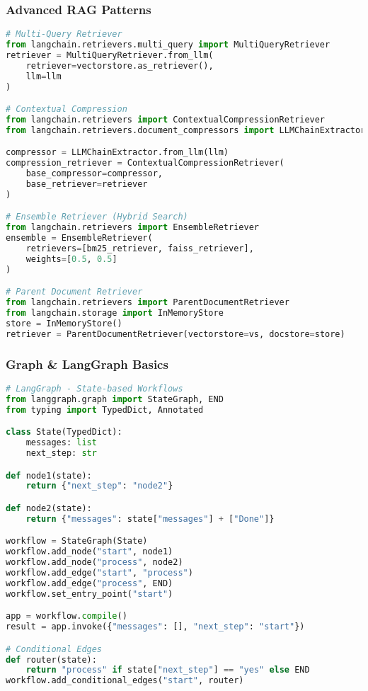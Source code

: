 \begin{frame}[fragile]\frametitle{Advanced RAG Patterns}
\begin{lstlisting}[language=python,basicstyle=\tiny]
# Multi-Query Retriever
from langchain.retrievers.multi_query import MultiQueryRetriever
retriever = MultiQueryRetriever.from_llm(
    retriever=vectorstore.as_retriever(),
    llm=llm
)

# Contextual Compression
from langchain.retrievers import ContextualCompressionRetriever
from langchain.retrievers.document_compressors import LLMChainExtractor

compressor = LLMChainExtractor.from_llm(llm)
compression_retriever = ContextualCompressionRetriever(
    base_compressor=compressor,
    base_retriever=retriever
)

# Ensemble Retriever (Hybrid Search)
from langchain.retrievers import EnsembleRetriever
ensemble = EnsembleRetriever(
    retrievers=[bm25_retriever, faiss_retriever],
    weights=[0.5, 0.5]
)

# Parent Document Retriever
from langchain.retrievers import ParentDocumentRetriever
from langchain.storage import InMemoryStore
store = InMemoryStore()
retriever = ParentDocumentRetriever(vectorstore=vs, docstore=store)
\end{lstlisting}
\end{frame}

\begin{frame}[fragile]\frametitle{Graph \& LangGraph Basics}
\begin{lstlisting}[language=python,basicstyle=\tiny]
# LangGraph - State-based Workflows
from langgraph.graph import StateGraph, END
from typing import TypedDict, Annotated

class State(TypedDict):
    messages: list
    next_step: str

def node1(state):
    return {"next_step": "node2"}

def node2(state):
    return {"messages": state["messages"] + ["Done"]}

workflow = StateGraph(State)
workflow.add_node("start", node1)
workflow.add_node("process", node2)
workflow.add_edge("start", "process")
workflow.add_edge("process", END)
workflow.set_entry_point("start")

app = workflow.compile()
result = app.invoke({"messages": [], "next_step": "start"})

# Conditional Edges
def router(state):
    return "process" if state["next_step"] == "yes" else END
workflow.add_conditional_edges("start", router)
\end{lstlisting}
\end{frame}

